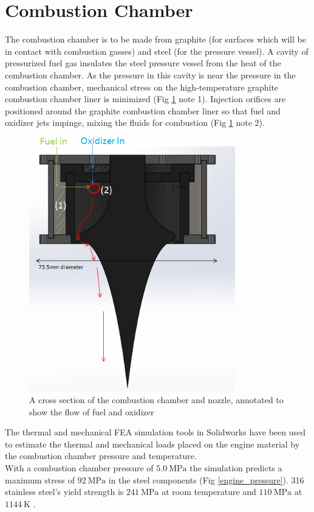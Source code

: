 \documentclass{article}
\begin{document}
\section{Combustion Chamber}
The combustion chamber is to be made from graphite (for surfaces which will be in contact with combustion gasses) and steel (for the pressure vessel). A cavity of pressurized fuel gas insulates the steel pressure vessel from the heat of the combustion chamber. As the pressure in this cavity is near the pressure in the combustion chamber, mechanical stress on the high-temperature graphite combustion chamber liner is minimized (Fig \ref{flow_concept} note 1). Injection orifices are positioned around the graphite combustion chamber liner so that fuel and oxidizer jets impinge, mixing the fluids for combustion (Fig \ref{flow_concept} note 2).
\begin{figure}[h!]
\centering
\includegraphics[width = 0.8\textwidth]{flow_concept.png}
\caption{A cross section of the combustion chamber and nozzle, annotated to show the flow of fuel and oxidizer} 
\label{flow_concept}
\end{figure}
The thermal and mechanical FEA simulation tools in Solidworks have been used to estimate the thermal and mechanical loads placed on the engine material by the combustion chamber pressure and temperature.\\
With a combustion chamber pressure of $\SI{5.0}{\mega\pascal}$ the simulation predicts a maximum stress of $\SI{92}{\mega\pascal}$ in the steel components (Fig \ref{engine_pressure}). 316 stainless steel's yield strength is $\SI{241}{\mega\pascal}$ at room temperature and $\SI{110}{\mega\pascal}$ at $\SI{1144}{\kelvin}$ \cite{316}.
\end{document}
